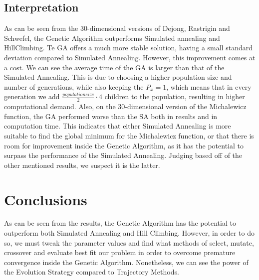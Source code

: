 \documentclass{article}
\begin{document}
\subsection{Interpretation}
As can be seen from the 30-dimensional versions of Dejong, Rastrigin and Schwefel, the Genetic Algorithm outperforms Simulated annealing and HillClimbing. Te GA offers a much more stable solution, having a small standard deviation compared to Simulated Annealing. However, this improvement comes at a cost. We can see the average time of the GA is larger than that of the Simulated Annealing. This is due to choosing a higher population size and number of generations, while also keeping the $P_x = 1$, which means that in every generation we add $\frac{population size}{2} \cdot 4$ children to the population, resulting in higher computational demand. Also, on the 30-dimensional version of the Michalewicz function, the GA performed worse than the SA both in results and in computation time. This indicates that either Simulated Annealing is more suitable to find the global minimum for the Michalewicz function, or that there is room for improvement inside the Genetic Algorithm, as it has the potential to surpass the performance of the Simulated Annealing. Judging based off of the other mentioned results, we suspect it is the latter.

\section{Conclusions}
As can be seen from the results, the Genetic Algorithm has the potential to outperform both Simulated Annealing and Hill Climbing. However, in order to do so, we must tweak the parameter values and find what methods of select, mutate, crossover and evaluate best fit our problem in order to overcome premature convergence inside the Genetic Algorithm. Nonetheless, we can see the power of the Evolution Strategy compared to Trajectory Methods.
\end{document}
